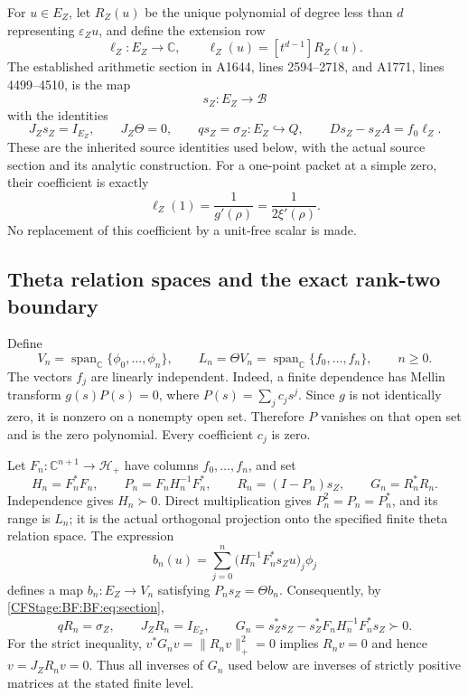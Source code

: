 For \(u\in E_Z\), let \(R_Z(u)\) be the unique polynomial of degree
less than \(d\) representing \(\varepsilon_Zu\), and define the
extension row
\begin{equation}
\ell_Z:E_Z\longrightarrow\mathbb C,\qquad
\ell_Z(u)=[t^{d-1}]R_Z(u).
\tag{BF.05}\label{CFStage:BF:BF:eq:extension-row}
\end{equation}
The established arithmetic section in A1644, lines 2594--2718, and
A1771, lines 4499--4510, is the map
\[
s_Z:E_Z\longrightarrow\mathcal B
\]
with the identities
\begin{equation}
J_Zs_Z=I_{E_Z},\qquad J_Z\Theta=0,\qquad
qs_Z=\sigma_Z:E_Z\hookrightarrow Q,\qquad
Ds_Z-s_ZA=f_0\ell_Z.
\tag{BF.06}\label{CFStage:BF:BF:eq:section}
\end{equation}
These are the inherited source identities used below, with the actual
source section and its analytic construction.  For a one-point packet
at a simple zero, their coefficient is exactly
\[
\ell_Z(1)=\frac{1}{g'(\rho)}
         =\frac{1}{2\xi'(\rho)}.
\]
No replacement of this coefficient by a unit-free scalar is made.

\subsection{Theta relation spaces and the exact rank-two boundary}
\label{CFStage:BF:BF:rank-two}

Define
\begin{equation}
V_n=\operatorname{span}_{\mathbb C}\{\phi_0,\ldots,\phi_n\},
\qquad
L_n=\Theta V_n
   =\operatorname{span}_{\mathbb C}\{f_0,\ldots,f_n\},
\qquad n\ge0.
\tag{BF.07}\label{CFStage:BF:BF:eq:relation-spaces}
\end{equation}
The vectors \(f_j\) are linearly independent.  Indeed, a finite
dependence has Mellin transform \(g(s)P(s)=0\), where
\(P(s)=\sum_jc_js^j\).  Since \(g\) is not identically zero, it is
nonzero on a nonempty open set.  Therefore \(P\) vanishes on that
open set and is the zero polynomial.  Every coefficient \(c_j\)
is zero.

Let \(F_n:\mathbb C^{n+1}\to\mathcal H_+\) have columns
\(f_0,\ldots,f_n\), and set
\begin{equation}
H_n=F_n^*F_n,\qquad
P_n=F_nH_n^{-1}F_n^*,\qquad
R_n=(I-P_n)s_Z,\qquad
G_n=R_n^*R_n.
\tag{BF.08}\label{CFStage:BF:BF:eq:representatives}
\end{equation}
Independence gives \(H_n\succ0\).  Direct multiplication gives
\(P_n^2=P_n=P_n^*\), and its range is \(L_n\); it is the actual
orthogonal projection onto the specified finite theta relation space.
The expression
\[
b_n(u)=\sum_{j=0}^n
\bigl(H_n^{-1}F_n^*s_Zu\bigr)_j\phi_j
\]
defines a map \(b_n:E_Z\to V_n\) satisfying \(P_ns_Z=\Theta b_n\).
Consequently, by \eqref{CFStage:BF:BF:eq:section},
\begin{equation}
qR_n=\sigma_Z,\qquad J_ZR_n=I_{E_Z},\qquad
G_n=s_Z^*s_Z-s_Z^*F_nH_n^{-1}F_n^*s_Z\succ0.
\tag{BF.09}\label{CFStage:BF:BF:eq:exact-class}
\end{equation}
For the strict inequality, \(v^*G_nv=\|R_nv\|_+^2=0\) implies
\(R_nv=0\) and hence \(v=J_ZR_nv=0\).  Thus all inverses of \(G_n\)
used below are inverses of strictly positive matrices at the stated
finite level.

